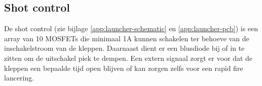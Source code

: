 \subsection{Shot control}

De shot control (zie bijlage \ref{app:launcher-schematic} en \ref{app:launcher-pcb}) is een array van 10 MOSFETs die minimaal 1A kunnen schakelen ter behoeve
van de inschakelstroom van de kleppen. Daarnaast dient er een blusdiode bij of in te
zitten om de uitschakel piek te dempen. Een extern signaal zorgt er voor dat de kleppen
een bepaalde tijd open blijven of kan zorgen zelfs voor een rapid fire lancering.

